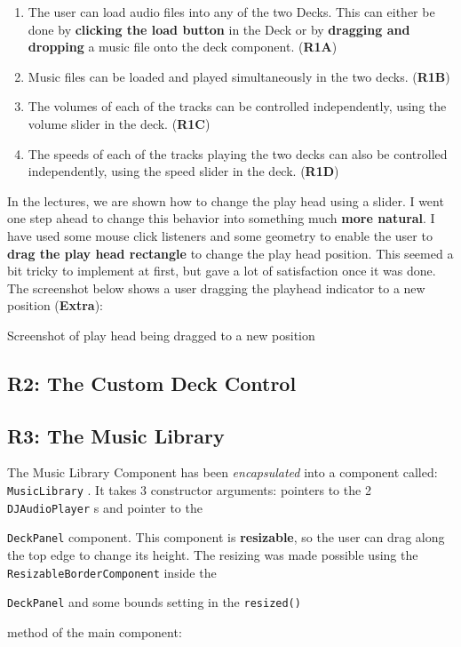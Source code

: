 \documentclass[12pt,]{article}
\let\oldtexttt\texttt
\renewcommand{\texttt}[1]{
  \colorbox{bgcolor}{\oldtexttt{#1}}
}
\begin{document}
\begin{enumerate}
\def\labelenumi{\arabic{enumi}.}
\item
  The user can load audio files into any of the two Decks. This can
  either be done by \textbf{clicking the load button} in the Deck or by
  \textbf{dragging and dropping} a music file onto the deck component.
  (\textbf{R1A})
\item
  Music files can be loaded and played simultaneously in the two decks.
  (\textbf{R1B})
\item
  The volumes of each of the tracks can be controlled independently,
  using the volume slider in the deck. (\textbf{R1C})
\item
  The speeds of each of the tracks playing the two decks can also be
  controlled independently, using the speed slider in the deck.
  (\textbf{R1D})
\end{enumerate}

In the lectures, we are shown how to change the play head using a
slider. I went one step ahead to change this behavior into something
much \textbf{more natural}. I have used some mouse click listeners and
some geometry to enable the user to \textbf{drag the play head
rectangle} to change the play head position. This seemed a bit tricky to
implement at first, but gave a lot of satisfaction once it was done. The
screenshot below shows a user dragging the playhead indicator to a new
position (\textbf{Extra}):

{Screenshot of play head being dragged to a new position}

\hypertarget{r2-the-custom-deck-control}{%
\subsection{R2: The Custom Deck
Control}\label{r2-the-custom-deck-control}}

\hypertarget{r3-the-music-library}{%
\subsection{R3: The Music Library}\label{r3-the-music-library}}

The Music Library Component has been \emph{encapsulated} into a
component called: \texttt{MusicLibrary}. It takes 3 constructor
arguments: pointers to the 2 \texttt{DJAudioPlayer}s and pointer to the
\texttt{DeckPanel} component. This component is \textbf{resizable}, so
the user can drag along the top edge to change its height. The resizing
was made possible using the \texttt{ResizableBorderComponent} inside the
\texttt{DeckPanel} and some bounds setting in the \texttt{resized()}
method of the main component:
\end{document}
